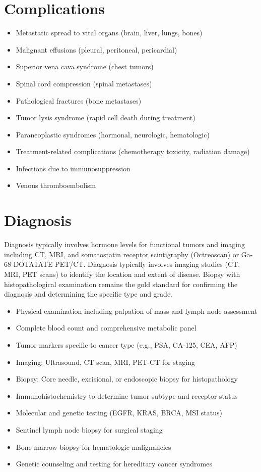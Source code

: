 \section{Complications}
\begin{itemize}[noitemsep]
  \item Metastatic spread to vital organs (brain, liver, lungs, bones)
  \item Malignant effusions (pleural, peritoneal, pericardial)
  \item Superior vena cava syndrome (chest tumors)
  \item Spinal cord compression (spinal metastases)
  \item Pathological fractures (bone metastases)
  \item Tumor lysis syndrome (rapid cell death during treatment)
  \item Paraneoplastic syndromes (hormonal, neurologic, hematologic)
  \item Treatment-related complications (chemotherapy toxicity, radiation damage)
  \item Infections due to immunosuppression
  \item Venous thromboembolism
\end{itemize}
\section{Diagnosis}
Diagnosis typically involves hormone levels for functional tumors and imaging including CT, MRI, and somatostatin receptor scintigraphy (Octreoscan) or Ga-68 DOTATATE PET/CT. Diagnosis typically involves imaging studies (CT, MRI, PET scans) to identify the location and extent of disease. Biopsy with histopathological examination remains the gold standard for confirming the diagnosis and determining the specific type and grade.

\begin{itemize}[noitemsep]
  \item Physical examination including palpation of mass and lymph node assessment
  \item Complete blood count and comprehensive metabolic panel
  \item Tumor markers specific to cancer type (e.g., PSA, CA-125, CEA, AFP)
  \item Imaging: Ultrasound, CT scan, MRI, PET-CT for staging
  \item Biopsy: Core needle, excisional, or endoscopic biopsy for histopathology
  \item Immunohistochemistry to determine tumor subtype and receptor status
  \item Molecular and genetic testing (EGFR, KRAS, BRCA, MSI status)
  \item Sentinel lymph node biopsy for surgical staging
  \item Bone marrow biopsy for hematologic malignancies
  \item Genetic counseling and testing for hereditary cancer syndromes
\end{itemize}
